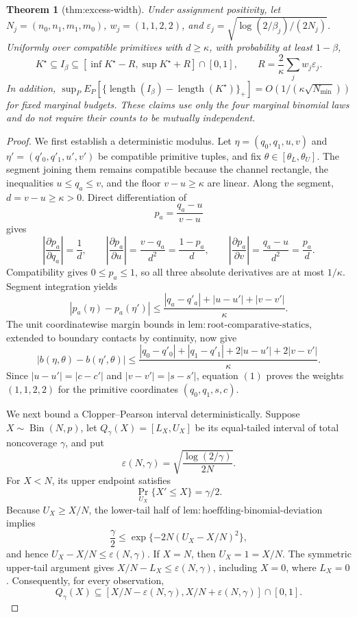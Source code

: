 \documentclass{article}
\newtheorem{theorem}{Theorem}
\begin{document}
\begin{theorem}[thm:excess-width]\label{thm:excess-width}
Under assignment positivity, let \(N_j=(n_0,n_1,m_1,m_0)\), \(w_j=(1,1,2,2)\), and \(\varepsilon_j=\sqrt{\log(2/\beta_j)/(2N_j)}\). Uniformly over compatible primitives with \(d\ge\kappa\), with probability at least \(1-\beta\), \[K^{\star}\subseteq I_{\beta}\subseteq[\inf K^{\star}-R,\sup K^{\star}+R]\cap[0,1],\qquad R=\frac{2}{\kappa}\sum_jw_j\varepsilon_j.\] In addition, \(\sup_P E_P[\{\operatorname{length}(I_{\beta})-\operatorname{length}(K^{\star})\}_{+}]=O(1/(\kappa\sqrt{N_{\min}}))\) for fixed marginal budgets. These claims use only the four marginal binomial laws and do not require their counts to be mutually independent.
\end{theorem}
\begin{proof}
We first establish a deterministic modulus. Let \(\eta=(q_0,q_1,u,v)\) and \(\eta'=(q'_0,q'_1,u',v')\) be compatible primitive tuples, and fix \(\theta\in[\theta_L,\theta_U]\). The segment joining them remains compatible because the channel rectangle, the inequalities \(u\leq q_a\leq v\), and the floor \(v-u\geq\kappa\) are linear. Along the segment, \(d=v-u\geq\kappa>0\). Direct differentiation of
\[
p_a=\frac{q_a-u}{v-u}
\]
gives
\[
\left|\frac{\partial p_a}{\partial q_a}\right|=\frac1d,
\qquad
\left|\frac{\partial p_a}{\partial u}\right|
=\frac{v-q_a}{d^2}=\frac{1-p_a}{d},
\qquad
\left|\frac{\partial p_a}{\partial v}\right|
=\frac{q_a-u}{d^2}=\frac{p_a}{d}.
\]
Compatibility gives \(0\leq p_a\leq1\), so all three absolute derivatives are at most \(1/\kappa\). Segment integration yields
\[
|p_a(\eta)-p_a(\eta')|
\leq\frac{|q_a-q'_a|+|u-u'|+|v-v'|}{\kappa}.
\]
The unit coordinatewise margin bounds in \(\mathrm{lem:root\text{-}comparative\text{-}statics}\), extended to boundary contacts by continuity, now give
\[
|b(\eta,\theta)-b(\eta',\theta)|
\leq\frac{|q_0-q'_0|+|q_1-q'_1|
+2|u-u'|+2|v-v'|}{\kappa}.
\tag{1}
\]
Since \(|u-u'|=|c-c'|\) and \(|v-v'|=|s-s'|\), equation \((1)\) proves the weights \((1,1,2,2)\) for the primitive coordinates \((q_0,q_1,s,c)\).

We next bound a Clopper--Pearson interval deterministically. Suppose \(X\sim\operatorname{Bin}(N,p)\), let \(Q_\gamma(X)=[L_X,U_X]\) be its equal-tailed interval of total noncoverage \(\gamma\), and put
\[
\varepsilon(N,\gamma)
=\sqrt{\frac{\log(2/\gamma)}{2N}}.
\]
For \(X<N\), its upper endpoint satisfies
\[
\Pr_{U_X}\{X'\leq X\}=\gamma/2.
\]
Because \(U_X\geq X/N\), the lower-tail half of \(\mathrm{lem:hoeffding\text{-}binomial\text{-}deviation}\) implies
\[
\frac\gamma2
\leq\exp\{-2N(U_X-X/N)^2\},
\]
and hence \(U_X-X/N\leq\varepsilon(N,\gamma)\). If \(X=N\), then \(U_X=1=X/N\). The symmetric upper-tail argument gives \(X/N-L_X\leq\varepsilon(N,\gamma)\), including \(X=0\), where \(L_X=0\). Consequently, for every observation,
\[
Q_\gamma(X)
\subseteq
[X/N-\varepsilon(N,\gamma),X/N+\varepsilon(N,\gamma)]\cap[0,1].
\tag{2}
\]


\end{proof}
\end{document}
